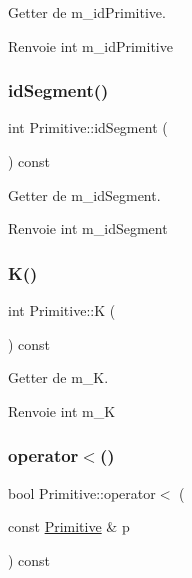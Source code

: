 Getter de m\+\_\+id\+Primitive. 

\begin{DoxyReturn}{Renvoie}
int m\+\_\+id\+Primitive 
\end{DoxyReturn}
\mbox{\label{classPrimitive_a42806c3e24a4f0e06688ee38cbfdc8e7}} 
\subsubsection{\texorpdfstring{id\+Segment()}{idSegment()}}
{\footnotesize\ttfamily int Primitive\+::id\+Segment (\begin{DoxyParamCaption}{ }\end{DoxyParamCaption}) const}



Getter de m\+\_\+id\+Segment. 

\begin{DoxyReturn}{Renvoie}
int m\+\_\+id\+Segment 
\end{DoxyReturn}
\mbox{\label{classPrimitive_a1a78dc24085b7a840f22dd66a981530b}} 
\subsubsection{\texorpdfstring{K()}{K()}}
{\footnotesize\ttfamily int Primitive\+::K (\begin{DoxyParamCaption}{ }\end{DoxyParamCaption}) const}



Getter de m\+\_\+K. 

\begin{DoxyReturn}{Renvoie}
int m\+\_\+K 
\end{DoxyReturn}
\mbox{\label{classPrimitive_aef2d33af9762c7799b98f8c0cf74ee2a}} 
\subsubsection{\texorpdfstring{operator$<$()}{operator<()}}
{\footnotesize\ttfamily bool Primitive\+::operator$<$ (\begin{DoxyParamCaption}\item[{const \hyperlink{classPrimitive}{Primitive} \&}]{p }\end{DoxyParamCaption}) const}



